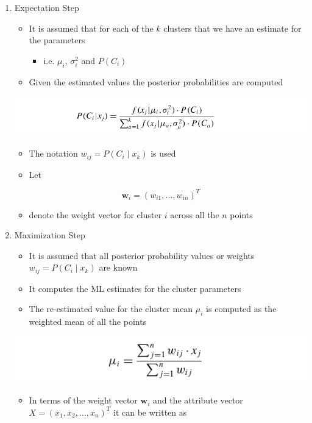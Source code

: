 \documentclass[11pt]{article}
\begin{document}
\begin{enumerate}
\item Expectation Step
\label{sec:orgb8934a0}
\begin{itemize}
\item It is assumed that for each of the \(k\) clusters that we have an estimate for the parameters
\begin{itemize}
\item i.e. \(\mu_i\), \(\sigma_i^2\) and \(P(C_i)\)
\end{itemize}
\item Given the estimated values the posterior probabilities are computed
\end{itemize}
\begin{center}
\includegraphics[width=.9\linewidth]{Representative-based Clustering/screenshot_2018-11-27_20-26-56.png}
\end{center}
\begin{itemize}
\item The notation \(w_{ij} = P(C_i \mid x_k)\) is used
\item Let
\end{itemize}
\begin{equation}
  \pmb w_i = (w_{i1}, \dots, w_{in})^T
\end{equation}
\begin{itemize}
\item denote the weight vector for cluster \(i\) across all the \(n\) points
\end{itemize}

\item Maximization Step
\label{sec:org9f5fb64}
\begin{itemize}
\item It is assumed that all posterior probability values or weights \(w_{ij} = P(C_i \mid x_k)\) are known
\item It computes the ML estimates for the cluster parameters
\item The re-estimated value for the cluster mean \(\mu_i\) is computed as the weighted mean of all the points
\end{itemize}
\begin{center}
\includegraphics[width=.9\linewidth]{Representative-based Clustering/screenshot_2018-11-27_20-34-42.png}
\end{center}
\begin{itemize}
\item In terms of the weight vector \(\pmb w_i\) and the attribute vector \(X = (x_1, x_2, \dots, x_n)^T\) it can be written as
\end{itemize}


\end{enumerate}
\end{document}
